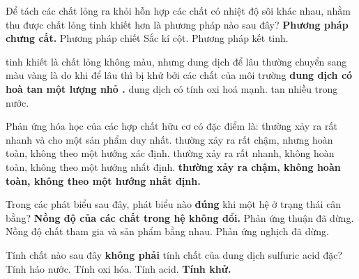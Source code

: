 \documentclass[11pt,a4paper]{article}
\begin{document}
\begin{ex}
Để tách các chất lỏng ra khỏi hỗn hợp các chất có nhiệt độ sôi khác nhau, nhằm thu được chất lỏng tinh khiết hơn là phương pháp nào sau đây?
\choice
{{\textbf{\color{hfRed}Phương pháp chưng cất.}}}
{Phương pháp chiết}
{Sắc kí cột.}
{Phương pháp kết tinh.}
\end{ex}
\begin{ex}
 tinh khiết là chất lỏng không màu, nhưng dung dịch  để lâu thường chuyển sang màu vàng là do
\choice
{khi để lâu thì  bị khử bởi các chất của môi trường}
{{\textbf{\color{hfRed}dung dịch  có hoà tan một lượng nhỏ .}}}
{dung dịch  có tính oxi hoá mạnh.}
{ tan nhiều trong nước.}
\end{ex}
\begin{ex}
Phản ứng hóa học của các hợp chất hữu cơ có đặc điểm là:
\choice
{thường xảy ra rất nhanh và cho một sản phẩm duy nhất.}
{thường xảy ra rất chậm, nhưng hoàn toàn, không theo một hướng xác định.}
{thường xảy ra rất nhanh, không hoàn toàn, không theo một hướng nhất định.}
{{\textbf{\color{hfRed}thường xảy ra chậm, không hoàn toàn, không theo một hướng nhất định.}}}
\end{ex}
\begin{ex}
Trong các phát biểu sau đây, phát biểu nào \textbf{đúng} khi một hệ ở trạng thái cân bằng?
\choice
{{\textbf{\color{hfRed}Nồng độ của các chất trong hệ không đổi.}}}
{Phản ứng thuận đã dừng.}
{Nồng độ chất tham gia và sản phẩm bằng nhau.}
{Phản ứng nghịch đã dừng.}
\end{ex}
\begin{ex}
Tính chất nào sau đây \textbf{không phải} tính chất của dung dịch sulfuric acid đặc?
\choice
{Tính háo nước.}
{Tính oxi hóa.}
{Tính acid.}
{{\textbf{\color{hfRed}Tính khử.}}}
\end{ex}
\end{document}
